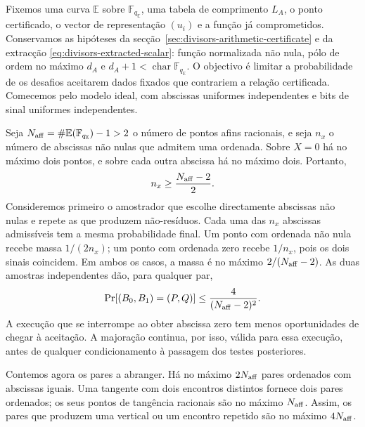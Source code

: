 
Fixemos uma curva \(\mathbb E\) sobre
\(\mathbb F_{q_{\mathbb E}}\), uma tabela de comprimento
\(L_A\), o ponto certificado, o vector de representação
\((u_i)\) e a função já comprometidos.
Conservamos as hipóteses da
secção~\ref{sec:divisors-arithmetic-certificate} e da extracção
\eqref{eq:divisors-extracted-scalar}: função normalizada
não nula, pólo de ordem no máximo \(d_A\) e
\(d_A+1<\operatorname{char}\mathbb F_{q_{\mathbb E}}\).
O objectivo é limitar a probabilidade de os desafios
aceitarem dados fixados que contrariem a relação certificada.
Comecemos pelo modelo ideal, com abscissas uniformes
independentes e bits de sinal uniformes independentes.

Seja \(N_{\rm aff}=\#\mathbb E(\mathbb F_{q_{\mathbb E}})-1>2\)
o número de pontos afins racionais, e seja \(n_x\) o
número de abscissas não nulas que admitem uma ordenada.
Sobre \(X=0\) há no máximo dois pontos, e sobre cada
outra abscissa há no máximo dois. Portanto,
\[
 n_x\geq\frac{N_{\rm aff}-2}{2}.
\]
Consideremos primeiro o amostrador que escolhe directamente
abscissas não nulas e repete as que produzem não-resíduos.
Cada uma das \(n_x\) abscissas admissíveis tem a mesma
probabilidade final. Um ponto com ordenada não nula recebe
massa \(1/(2n_x)\); um ponto com ordenada zero recebe
\(1/n_x\), pois os dois sinais coincidem. Em ambos os
casos, a massa é no máximo \(2/(N_{\rm aff}-2)\).
As duas amostras independentes dão, para qualquer par,
\begin{equation}
 \Pr[(B_0,B_1)=(P,Q)]
       \leq\frac{4}{(N_{\rm aff}-2)^2}.
 \label{eq:fcmp-sampler-pair-bound}
\end{equation}
A execução que se interrompe ao obter abscissa zero tem
menos oportunidades de chegar à aceitação. A majoração
continua, por isso, válida para essa execução, antes de
qualquer condicionamento à passagem dos testes posteriores.

Contemos agora os pares a abranger. Há no máximo
\(2N_{\rm aff}\) pares ordenados com abscissas iguais.
Uma tangente com dois encontros distintos fornece dois
pares ordenados; os seus pontos de tangência racionais
são no máximo \(N_{\rm aff}\). Assim, os pares que
produzem uma vertical ou um encontro repetido são no
máximo \(4N_{\rm aff}\).


